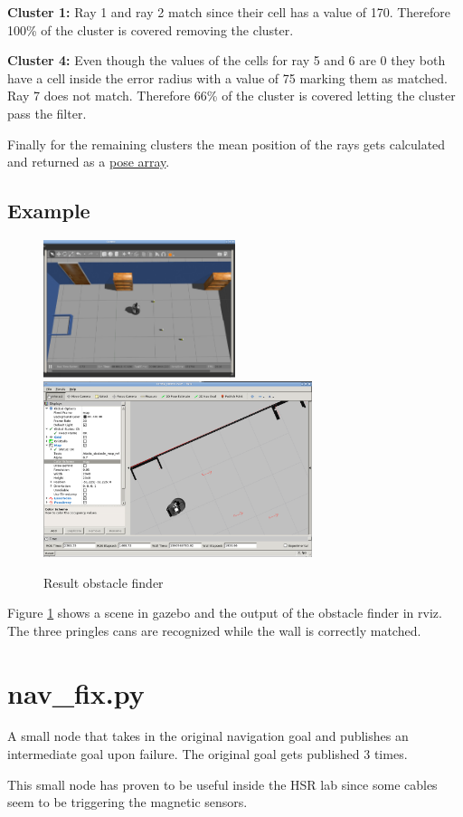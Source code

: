 \documentclass[main.tex]{subfiles}
\begin{document}
		\textbf{Cluster 1:}
		Ray 1 and ray 2 match since their cell has a value of 170. Therefore 100\% of the cluster is covered removing the cluster.
		
		\textbf{Cluster 4:}
		Even though the values of the cells for ray 5 and 6 are 0 they both have a cell inside the error radius with a value of 75 marking them as matched. Ray 7 does not match. Therefore 66\% of the cluster is covered letting the cluster pass the filter.
		
		Finally for the remaining clusters the mean position of the rays gets calculated and returned as a \href{http://docs.ros.org/melodic/api/geometry_msgs/html/msg/PoseArray.html}{pose array}. 
		
		\subsection{Example}
		
		\begin{figure}[H]
			\centering
			\includegraphics[width=0.5\textwidth]{pictures/obstacle_finder/scene_gazebo.PNG}
			\includegraphics[width=0.7\textwidth]{pictures/obstacle_finder/result_obstacle_finder.PNG}
			\caption{Result obstacle finder}
			\label{img_res_obs_finder}
		\end{figure}
	
		Figure \ref{img_res_obs_finder} shows a scene in gazebo and the output of the obstacle finder in rviz. The three pringles cans are recognized while the wall is correctly matched.
		
		\section{nav\_fix.py}
		A small node that takes in the original navigation goal and publishes an intermediate goal upon failure. The original goal gets published 3 times.
		
		This small node has proven to be useful inside the HSR lab since some cables seem to be triggering the magnetic sensors.

	\endgroup
\end{document}
